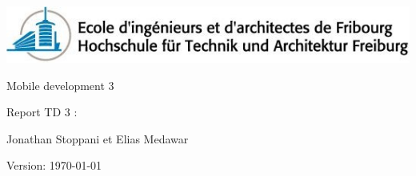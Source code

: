 \begin{titlepage}
	

		
	\addtolength{\leftskip}{-1cm}\addtolength{\rightskip}{-3.5cm}
	\vfill
	
	\hspace{0.10cm}	\includegraphics{./images/model/eifr-logo.jpg} 

	\vfill
	\hspace{8.99cm}\Huge Mobile development  3 
	
	\hspace{9.08cm}\LARGE Report TD 3 : 
	      
	\vfill
	\Large
	
	\hspace{9.08cm}  Jonathan Stoppani et Elias Medawar
	
	\vfill
	\hspace{9.08cm}\normalsize Version:  \today
	\vfill
	\thispagestyle{empty}
	\clearpage

\end{titlepage}
